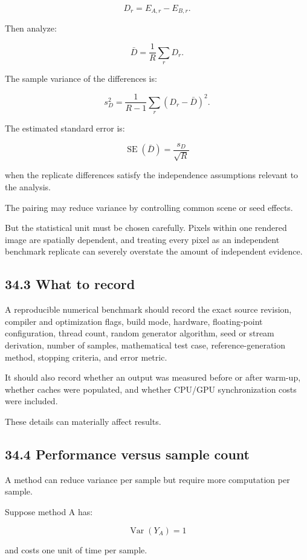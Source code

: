 \[ D_r=E_{A,r}-E_{B,r}. \]

Then analyze:

\[ \bar D= \frac1R\sum_rD_r. \]

The sample variance of the differences is:

\[ s_D^2= \frac1{R-1}\sum_r(D_r-\bar D)^2. \]

The estimated standard error is:

\[ \boxed{ \operatorname{SE}(\bar D) = \frac{s_D}{\sqrt R} } \]

when the replicate differences satisfy the independence assumptions relevant to the analysis.

The pairing may reduce variance by controlling common scene or seed effects.

But the statistical unit must be chosen carefully. Pixels within one rendered image are spatially dependent, and treating every pixel as an independent benchmark replicate can severely overstate the amount of independent evidence.

\subsection{34.3 What to record}\label{02-foundations-ii-ch031-what-to-record}

A reproducible numerical benchmark should record the exact source revision, compiler and optimization flags, build mode, hardware, floating-point configuration, thread count, random generator algorithm, seed or stream derivation, number of samples, mathematical test case, reference-generation method, stopping criteria, and error metric.

It should also record whether an output was measured before or after warm-up, whether caches were populated, and whether CPU/GPU synchronization costs were included.

These details can materially affect results.

\subsection{34.4 Performance versus sample count}\label{02-foundations-ii-ch031-performance-versus-sample-count}

A method can reduce variance per sample but require more computation per sample.

Suppose method A has:

\[ \operatorname{Var}(Y_A)=1 \]

and costs one unit of time per sample.

